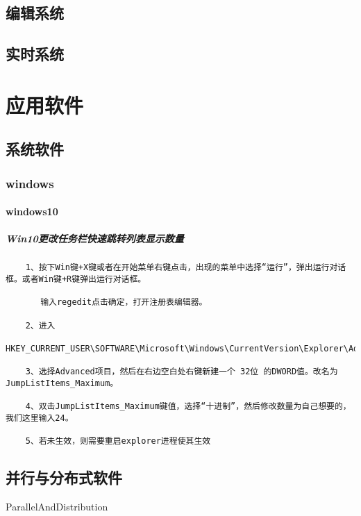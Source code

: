 \documentclass[UTF8]{../computerUniverse}
\begin{document}
\section{编辑系统}

\section{实时系统}


\chapter{应用软件}

\section{系统软件}

\subsection{windows}

\subsubsection{windows10}

\paragraph{Win10更改任务栏快速跳转列表显示数量}



\begin{lstlisting}
    1、按下Win键+X键或者在开始菜单右键点击，出现的菜单中选择“运行”，弹出运行对话框。或者Win键+R键弹出运行对话框。
    
       输入regedit点击确定，打开注册表编辑器。
    
    2、进入 
    HKEY_CURRENT_USER\SOFTWARE\Microsoft\Windows\CurrentVersion\Explorer\Advanced
    
    3、选择Advanced项目，然后在右边空白处右键新建一个 32位 的DWORD值。改名为JumpListItems_Maximum。
    
    4、双击JumpListItems_Maximum键值，选择“十进制”，然后修改数量为自己想要的，我们这里输入24。
    
    5、若未生效，则需要重启explorer进程使其生效
\end{lstlisting}



\section{并行与分布式软件}
ParallelAndDistribution
\end{document}
